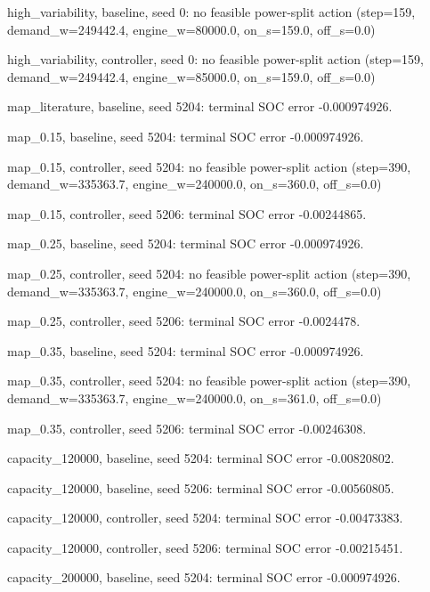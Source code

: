 \item high\_variability, baseline, seed 0: no feasible power-split action (step=159, demand\_w=249442.4, engine\_w=80000.0, on\_s=159.0, off\_s=0.0)
\item high\_variability, controller, seed 0: no feasible power-split action (step=159, demand\_w=249442.4, engine\_w=85000.0, on\_s=159.0, off\_s=0.0)
\item map\_literature, baseline, seed 5204: terminal SOC error -0.000974926.
\item map\_0.15, baseline, seed 5204: terminal SOC error -0.000974926.
\item map\_0.15, controller, seed 5204: no feasible power-split action (step=390, demand\_w=335363.7, engine\_w=240000.0, on\_s=360.0, off\_s=0.0)
\item map\_0.15, controller, seed 5206: terminal SOC error -0.00244865.
\item map\_0.25, baseline, seed 5204: terminal SOC error -0.000974926.
\item map\_0.25, controller, seed 5204: no feasible power-split action (step=390, demand\_w=335363.7, engine\_w=240000.0, on\_s=360.0, off\_s=0.0)
\item map\_0.25, controller, seed 5206: terminal SOC error -0.0024478.
\item map\_0.35, baseline, seed 5204: terminal SOC error -0.000974926.
\item map\_0.35, controller, seed 5204: no feasible power-split action (step=390, demand\_w=335363.7, engine\_w=240000.0, on\_s=361.0, off\_s=0.0)
\item map\_0.35, controller, seed 5206: terminal SOC error -0.00246308.
\item capacity\_120000, baseline, seed 5204: terminal SOC error -0.00820802.
\item capacity\_120000, baseline, seed 5206: terminal SOC error -0.00560805.
\item capacity\_120000, controller, seed 5204: terminal SOC error -0.00473383.
\item capacity\_120000, controller, seed 5206: terminal SOC error -0.00215451.
\item capacity\_200000, baseline, seed 5204: terminal SOC error -0.000974926.